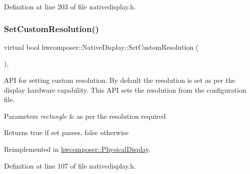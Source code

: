 Definition at line 203 of file nativedisplay.\+h.


\begin{DoxyCode}{0}
\end{DoxyCode}
\mbox{\label{classhwcomposer_1_1NativeDisplay_a8c3c29de10cc3c6e33a90e176d65b003}} 
\subsubsection{\texorpdfstring{Set\+Custom\+Resolution()}{SetCustomResolution()}}
{\footnotesize\ttfamily virtual bool hwcomposer\+::\+Native\+Display\+::\+Set\+Custom\+Resolution (\begin{DoxyParamCaption}\item[{const Hwc\+Rect$<$ int32\+\_\+t $>$ \&}]{ }\end{DoxyParamCaption})\hspace{0.3cm}{\ttfamily [inline]}, {\ttfamily [virtual]}}

A\+PI for setting custom resolution. By default the resolution is set as per the display hardware capability. This A\+PI sets the resolution from the configuration file. 
\begin{DoxyParams}{Parameters}
{\em rectangle} & as per the resolution required \\
\hline
\end{DoxyParams}
\begin{DoxyReturn}{Returns}
true if set passes, false otherwise 
\end{DoxyReturn}


Reimplemented in \mbox{\hyperlink{classhwcomposer_1_1PhysicalDisplay_a8f67530a852d9e6e65874e4835b35dab}{hwcomposer\+::\+Physical\+Display}}.



Definition at line 107 of file nativedisplay.\+h.


\begin{DoxyCode}{0}
\end{DoxyCode}
\mbox{\label{classhwcomposer_1_1NativeDisplay_a86dd66badac1df8de1ca56133249a222}} 
